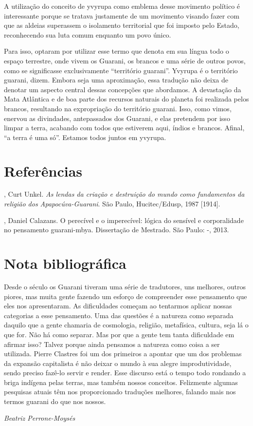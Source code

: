 A utilização do conceito de yvyrupa como emblema desse movimento
político é interessante porque se tratava justamente de um movimento
visando fazer com que as aldeias superassem o isolamento territorial
que foi imposto pelo Estado, reconhecendo sua luta comum enquanto um
povo único.

Para isso, optaram por utilizar esse termo que denota em sua língua todo
o espaço terrestre, onde vivem os Guarani, os brancos e uma série de
outros povos, como se significasse exclusivamente ``território guarani''.
Yvyrupa é o território guarani, dizem. Embora seja uma aproximação,
essa tradução não deixa de denotar um aspecto central dessas concepções
que abordamos. A devastação da Mata Atlântica e de boa parte dos
recursos naturais do planeta foi realizada pelos brancos, resultando na
expropriação do território guarani. Isso, como vimos, enervou as
divindades, antepassados dos Guarani, e elas pretendem por isso limpar
a terra, acabando com todos que estiverem aqui, índios e brancos.
Afinal, ``a terra é uma só''. Estamos todos juntos em yvyrupa.

\section{Referências}

\begin{Parskip}
, Curt Unkel. \emph{As lendas da criação e destruição do mundo
como fundamentos da religião dos Apapocúva-Guarani}. São Paulo,
Hucitec/Edusp, 1987 [1914].

, Daniel Calazans. O perecível e o imperecível: lógica do
sensível e corporalidade no pensamento guarani-mbya. Dissertação de
Mestrado. São Paulo: -, 2013.

\end{Parskip}

\section{Nota bibliográfica}
Desde o século  os Guarani tiveram uma série de tradutores, uns
melhores, outros piores, mas muita gente fazendo um esforço de
compreender esse pensamento que eles nos apresentaram. As dificuldades
começam ao tentarmos aplicar nossas categorias a esse pensamento. Uma
das questões é a natureza como separada daquilo que a gente chamaria de
cosmologia, religião, metafísica, cultura, seja lá o que for. Não há
como separar. Mas por que a gente tem tanta dificuldade em afirmar
isso? Talvez porque ainda pensamos a natureza como coisa a ser
utilizada. Pierre Clastres foi um dos primeiros a apontar que um dos
problemas da expansão capitalista é não deixar o mundo à sua alegre
improdutividade, sendo preciso fazê-lo servir e render. Esse discurso
está o tempo todo rondando a briga indígena pelas terras, mas também
nossos conceitos. Felizmente algumas pesquisas atuais têm nos
proporcionado traduções melhores, falando mais nos termos guarani do
que nos nossos.
\medskip
\begin{flushright}
\emph{Beatriz Perrone-Moysés}
\end{flushright}


